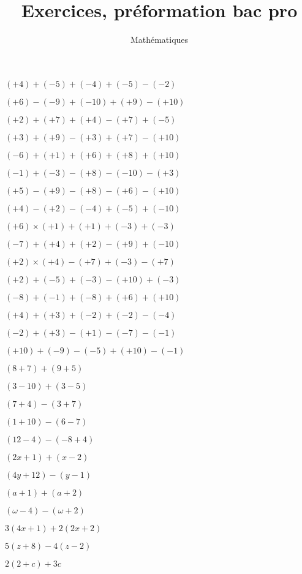 \documentclass[a4paper,12pt]{scrartcl}
\date{}
\title{Exercices, préformation bac pro}
\author{Mathématiques}
\begin{document}
\maketitle


\question{}
$(+4)+(-5)+(-4)+(-5)-(-2)$

\question{}
$(+6)-(-9)+(-10)+(+9)-(+10)$

\question{}
$(+2)+(+7)+(+4)-(+7)+(-5)$

\question{}
$(+3)+(+9)-(+3)+(+7)-(+10)$

\question{}
$(-6)+(+1)+(+6)+(+8)+(+10)$

\question{}
$(-1)+(-3)-(+8)-(-10)-(+3)$

\question{}
$(+5)-(+9)-(+8)-(+6)-(+10)$

\question{}
$(+4)-(+2)-(-4)+(-5)+(-10)$


\question{}
$(+6)\times(+1)+(+1)+(-3)+(-3)$

\question{}
$(-7)+(+4)+(+2)-(+9)+(-10)$

\question{}
$(+2)\times(+4)-(+7)+(-3)-(+7)$

\question{}
$(+2)+(-5)+(-3)-(+10)+(-3)$

\question{}
$(-8)+(-1)+(-8)+(+6)+(+10)$

\question{}
$(+4)+(+3)+(-2)+(-2)-(-4)$

\question{}
$(-2)+(+3)-(+1)-(-7)-(-1)$

\question{}
$(+10)+(-9)-(-5)+(+10)-(-1)$


\question{}
$(8+7)+(9+5)$

\question{}
$(3-10)+(3-5)$

\question{}
$(7+4)-(3+7)$

\question{}
$(1+10)-(6-7)$

\question{}
$(12-4)-(-8+4)$

\exo{}

\question{}
$(2x+1)+(x-2)$

\question{}
$(4y+12)-(y-1)$

\question{}
$(a+1)+(a+2)$

\question{}
$(\omega - 4)-(\omega + 2)$

\exo{}

\question{}
$3(4x+1)+2(2x+2)$

\question{}
$5(z+8)-4(z-2)$

\question{}
$2(2+c)+3c$
\end{document}
